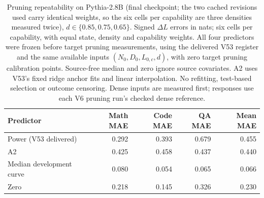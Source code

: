 \begin{table}[H]
\centering\footnotesize
\begin{tabular}{@{}lrrrr@{}}
\toprule
Predictor & Math MAE & Code MAE & QA MAE & Mean MAE \\
\midrule
Power (V53 delivered) & 0.292 & 0.393 & 0.679 & 0.455 \\
A2 & 0.425 & 0.458 & 0.437 & 0.440 \\
Median development curve & 0.080 & 0.054 & 0.065 & 0.066 \\
Zero & 0.218 & 0.145 & 0.326 & 0.230 \\
\bottomrule
\end{tabular}
\caption{Pruning repeatability on Pythia-2.8B (final checkpoint; the two cached revisions used carry identical weights, so the six cells per capability are three densities measured twice), $d\in\{0.85,0.75,0.65\}$. Signed $\Delta L$ errors in nats; six cells per capability, with equal state, density and capability weights. All four predictors were frozen before target pruning measurements, using the delivered V53 register and the same available inputs $(N_0,D_0,L_{0,c},d)$, with zero target pruning calibration points. Source-free median and zero ignore source covariates. A2 uses V53's fixed ridge anchor fits and linear interpolation. No refitting, test-based selection or outcome censoring. Dense inputs are measured first; responses use each V6 pruning run's checked dense reference.}
\label{tab:prune_repeat}
\end{table}
